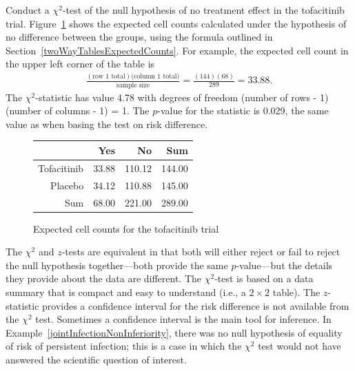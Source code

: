 \begin{examplewrap}
  \begin{nexample}{Conduct a $\chi^2$-test of the null hypothesis of no treatment effect in the tofacitinib trial.}\label{tofacitinibVsPlaceboChiSq}
Figure~\ref{tofacitinibVsPlaceboExpected} shows the expected cell counts calculated under the hypothesis of no difference between the groups, using the formula outlined in Section~\ref{twoWayTablesExpectedCounts}.  For example, the expected cell count in the upper left corner of the table is
\begin{align*}
  \frac{(\text{row 1 total})(\text{column 1 total)}}{\text{sample size}} =
  \frac{(144)(68)}{289} = 33.88.
\end{align*}
The $\chi^2$-statistic has value 4.78 with degrees of freedom (number of rows - 1)(number of columns - 1) = 1. The $p$-value for the statistic is 0.029, the same value as when basing the test on risk difference.
\end{nexample}
\end{examplewrap}
\begin{figure}[ht]
\centering
\begin{tabular}{rrrr}
  \hline
 & Yes & No & Sum \\ 
  \hline
Tofacitinib & 33.88 & 110.12 & 144.00 \\ 
  Placebo & 34.12 & 110.88 & 145.00 \\ 
  Sum & 68.00 & 221.00 & 289.00 \\ 
   \hline
\end{tabular}
\caption{Expected cell counts for the tofacitinib trial} 
\label{tofacitinibVsPlaceboExpected}
\end{figure}   

The $\chi^2$ and $z$-tests are equivalent in that both will either reject or fail to reject the null hypothesis together---both provide the same $p$-value---but the details they provide about the data are different.  The $\chi^2$-test is based on a data summary that is compact and easy to understand (i.e., a $2 \times 2$ table).  The $z$-statistic provides a confidence interval for the risk difference is not available from the $\chi^2$ test.  Sometimes a confidence interval is the main tool for inference.  In Example~\ref{jointInfectionNonInferiority}, there was no null hypothesis of equality of risk of persistent infection; this is a case in which the $\chi^2$ test would not have answered the scientific question of interest.

